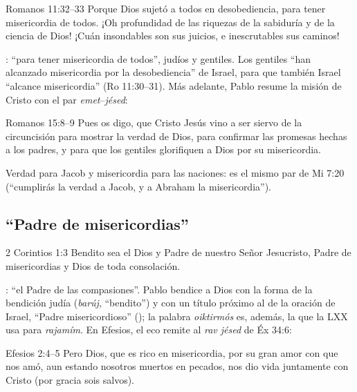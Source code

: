 \begin{verso}{Romanos 11:32–33}
Porque Dios sujetó a todos en desobediencia, para tener misericordia de todos. ¡Oh profundidad de las riquezas de la sabiduría y de la ciencia de Dios! ¡Cuán insondables son sus juicios, e inescrutables sus caminos!
\end{verso}

: ``para tener misericordia de todos'', judíos y gentiles. Los gentiles ``han alcanzado misericordia por la desobediencia'' de Israel, para que también Israel ``alcance misericordia'' (Ro 11:30--31). Más adelante, Pablo resume la misión de Cristo con el par \emph{emet}--\emph{jésed}:

\begin{verso}{Romanos 15:8–9}
Pues os digo, que Cristo Jesús vino a ser siervo de la circuncisión para mostrar la verdad de Dios, para confirmar las promesas hechas a los padres, y para que los gentiles glorifiquen a Dios por su misericordia.
\end{verso}

Verdad para Jacob y misericordia para las naciones: es el mismo par de Mi 7:20 (``cumplirás la verdad a Jacob, y a Abraham la misericordia'').


\subsection{“Padre de misericordias”}
\begin{verso}{2 Corintios 1:3}
Bendito sea el Dios y Padre de nuestro Señor Jesucristo, Padre de misericordias y Dios de toda consolación.
\end{verso}

: ``el Padre de las compasiones''. Pablo bendice a Dios con la forma de la bendición judía (\emph{barúj}, ``bendito'') y con un título próximo al de la oración de Israel, ``Padre misericordioso'' (); la palabra \emph{oiktirmós} es, además, la que la LXX usa para \emph{rajamím}. En Efesios, el eco remite al \emph{rav jésed} de Éx 34:6:

\begin{verso}{Efesios 2:4–5}
Pero Dios, que es rico en misericordia, por su gran amor con que nos amó, aun estando nosotros muertos en pecados, nos dio vida juntamente con Cristo (por gracia sois salvos).
\end{verso}

